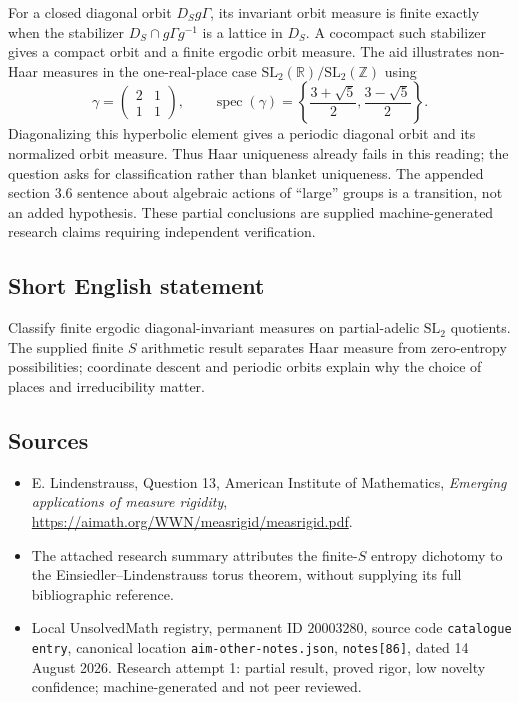 \documentclass[11pt]{article}
\newcommand{\Z}{\mathbb{Z}}
\newcommand{\R}{\mathbb{R}}
\begin{document}
For a closed diagonal orbit $D_Sg\Gamma$, its invariant orbit measure is finite exactly when the stabilizer $D_S\cap g\Gamma g^{-1}$ is a lattice in $D_S$. A cocompact such stabilizer gives a compact orbit and a finite ergodic orbit measure. The aid illustrates non-Haar measures in the one-real-place case $\mathrm{SL}_2(\R)/\mathrm{SL}_2(\Z)$ using
\[
 \gamma=\begin{pmatrix}2&1\\1&1\end{pmatrix},\qquad
 \operatorname{spec}(\gamma)=\left\{\frac{3+\sqrt5}{2},\frac{3-\sqrt5}{2}\right\}.
\]
Diagonalizing this hyperbolic element gives a periodic diagonal orbit and its normalized orbit measure. Thus Haar uniqueness already fails in this reading; the question asks for classification rather than blanket uniqueness. The appended section 3.6 sentence about algebraic actions of ``large'' groups is a transition, not an added hypothesis. These partial conclusions are supplied machine-generated research claims requiring independent verification.
\subsection{Short English statement}
Classify finite ergodic diagonal-invariant measures on partial-adelic $\mathrm{SL}_2$ quotients. The supplied finite $S$ arithmetic result separates Haar measure from zero-entropy possibilities; coordinate descent and periodic orbits explain why the choice of places and irreducibility matter.
\subsection{Sources}
\begin{itemize}
\item E. Lindenstrauss, Question 13, American Institute of Mathematics, \emph{Emerging applications of measure rigidity}, \url{https://aimath.org/WWN/measrigid/measrigid.pdf}.
\item The attached research summary attributes the finite-$S$ entropy dichotomy to the Einsiedler--Lindenstrauss torus theorem, without supplying its full bibliographic reference.
\item Local UnsolvedMath registry, permanent ID $20003280$, source code \texttt{catalogue entry}, canonical location \texttt{aim-other-notes.json}, \texttt{notes[86]}, dated 14 August 2026. Research attempt 1: partial result, proved rigor, low novelty confidence; machine-generated and not peer reviewed.
\end{itemize}
\end{document}
